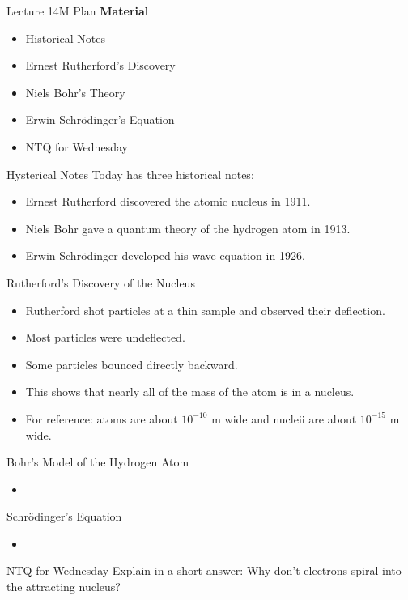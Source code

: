\documentclass[english]{beamer}
\begin{document}
\begin{frame}{Lecture 14M Plan}
  \textbf{Material}
  \begin{itemize}
    \item Historical Notes
    \item Ernest Rutherford's Discovery
    \item Niels Bohr's Theory
    \item Erwin Schr{\"o}dinger's Equation
    \item NTQ for Wednesday
  \end{itemize}
\end{frame}

\begin{frame}{Hysterical Notes}
  Today has three historical notes:
  \begin{itemize}
    \item Ernest Rutherford discovered the atomic nucleus in 1911.
    \item Niels Bohr gave a quantum theory of the hydrogen atom in 1913.
    \item Erwin Schr{\"o}dinger developed his wave equation in 1926.
  \end{itemize}
\end{frame}

\begin{frame}{Rutherford's Discovery of the Nucleus}
  \begin{itemize}
    \item Rutherford shot particles at a thin sample and observed their deflection.
    \item Most particles were undeflected.
    \item Some particles bounced directly backward.
    \item This shows that nearly all of the mass of the atom is in a nucleus.
    \item For reference: atoms are about $10^{-10}$ m wide and nucleii are about $10^{-15}$ m wide.
  \end{itemize}
\end{frame}

\begin{frame}{Bohr's Model of the Hydrogen Atom}
  \begin{itemize}
    \item 
  \end{itemize}
\end{frame}

\begin{frame}{Schr{\"o}dinger's Equation}
  \begin{itemize}
    \item
  \end{itemize}
\end{frame}

\begin{frame}{NTQ for Wednesday}
  Explain in a short answer: Why don't electrons spiral into the attracting nucleus?
\end{frame}
\end{document}
